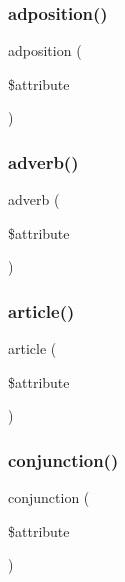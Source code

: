 \hypertarget{teibase_8php_ad24e98855f72a067dc60658ec8db3435}{}\label{teibase_8php_ad24e98855f72a067dc60658ec8db3435} 
\subsubsection{\texorpdfstring{adposition()}{adposition()}}
{\footnotesize\ttfamily adposition (\begin{DoxyParamCaption}\item[{}]{\$attribute }\end{DoxyParamCaption})}

\hypertarget{teibase_8php_aab932d0abbd74bb3e95b0ca5d75dfeea}{}\label{teibase_8php_aab932d0abbd74bb3e95b0ca5d75dfeea} 
\subsubsection{\texorpdfstring{adverb()}{adverb()}}
{\footnotesize\ttfamily adverb (\begin{DoxyParamCaption}\item[{}]{\$attribute }\end{DoxyParamCaption})}

\hypertarget{teibase_8php_a1300a7b74f1fcda334a3c291cf92167e}{}\label{teibase_8php_a1300a7b74f1fcda334a3c291cf92167e} 
\subsubsection{\texorpdfstring{article()}{article()}}
{\footnotesize\ttfamily article (\begin{DoxyParamCaption}\item[{}]{\$attribute }\end{DoxyParamCaption})}

\hypertarget{teibase_8php_a7e9a92d63a2b96fa0e06c8636014c558}{}\label{teibase_8php_a7e9a92d63a2b96fa0e06c8636014c558} 
\subsubsection{\texorpdfstring{conjunction()}{conjunction()}}
{\footnotesize\ttfamily conjunction (\begin{DoxyParamCaption}\item[{}]{\$attribute }\end{DoxyParamCaption})}

